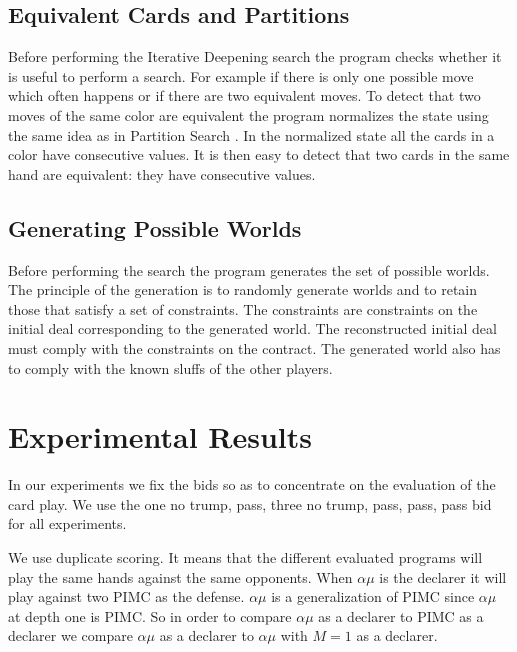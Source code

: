 \documentclass{ecai}
\begin{document}

\subsection{Equivalent Cards and Partitions}

Before performing the Iterative Deepening search the program checks
whether it is useful to perform a search. For example if there is only
one possible move which often happens or if there are two equivalent
moves. To detect that two moves of the same color are equivalent the
program normalizes the state using the same idea as in Partition
Search \cite{ginsberg96}. In the normalized state all the cards in a
color have consecutive values. It is then easy to detect that two
cards in the same hand are equivalent: they have consecutive values.

\subsection{Generating Possible Worlds}

Before performing the search the program generates the set of possible
worlds. The principle of the generation is to randomly generate worlds
and to retain those that satisfy a set of constraints. The constraints
are constraints on the initial deal corresponding to the generated
world. The reconstructed initial deal must comply with the constraints
on the contract. The generated world also has to comply with the known
sluffs of the other players.

\section{Experimental Results}

In our experiments we fix the bids so as to concentrate on the
evaluation of the card play. We use the one no trump, pass, three no
trump, pass, pass, pass bid for all experiments.

We use duplicate scoring. It means that the different evaluated
programs will play the same hands against the same opponents. When
$\alpha\mu$ is the declarer it will play against two PIMC as the
defense. $\alpha\mu$ is a generalization of PIMC since $\alpha\mu$
at depth one is PIMC. So in order to compare $\alpha\mu$ as a declarer
to PIMC as a declarer we compare $\alpha\mu$ as a declarer to
$\alpha\mu$ with $M=1$ as a declarer.
\end{document}

